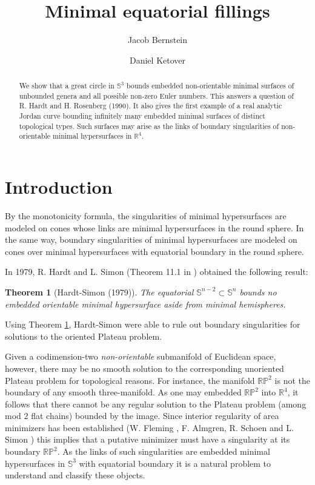 \documentclass[11pt, reqno]{amsart}
\newtheorem{thm}{Theorem}[section]
\numberwithin{equation}{section}
\begin{document}
\title{Minimal equatorial fillings}
\author{Jacob Bernstein}\address{Johns Hopkins University \\ 3400 N. Charles St, Baltimore MD 21218 USA}
\author{Daniel Ketover}\address{Rutgers University\\  Busch Campus - Hill Center \\ 110 Freylinghausen Road, Piscataway NJ 08854 USA} 


\begin{abstract}
We show that a great circle in $\mathbb{S}^3$ bounds embedded non-orientable minimal surfaces of unbounded genera and all possible non-zero Euler numbers.  This answers a question of R. Hardt and H. Rosenberg (1990). It also gives the first example of a real analytic Jordan curve bounding infinitely many embedded minimal surfaces of distinct topological types.  Such surfaces may arise as the links of boundary singularities of non-orientable minimal hypersurfaces in $\mathbb{R}^4$.  
\end{abstract}
\maketitle
\section{Introduction}

By the monotonicity formula, the singularities of minimal hypersurfaces are modeled on cones whose links are minimal hypersurfaces in the round sphere. In the same way, boundary singularities of minimal hypersurfaces are modeled on cones over minimal hypersurfaces with equatorial boundary in the round sphere.

In 1979, R. Hardt and L. Simon (Theorem 11.1 in \cite{HS}) obtained the following result:
\begin{thm}[Hardt-Simon (1979)]\label{orientable}
The equatorial $\mathbb{S}^{n-2}\subset\mathbb{S}^n$ bounds no embedded orientable minimal hypersurface aside from minimal hemispheres.
\end{thm}

Using Theorem \ref{orientable}, Hardt-Simon were able to rule out boundary singularities for solutions to the oriented Plateau problem.  

Given a codimension-two \emph{non-orientable} submanifold of Euclidean space, however, there may be no smooth solution to the corresponding unoriented Plateau problem for topological reasons. For instance, the manifold $\mathbb{RP}^2$ is not the boundary of any smooth three-manifold. As one may embedded $\mathbb{RP}^2$ into $\mathbb{R}^4$, it follows that there cannot be any regular solution to the Plateau problem (among mod $2$ flat chains) bounded by the image.  Since interior regularity of area minimizers has been established (W. Fleming \cite{Fleming2}, F. Almgren, R. Schoen and L. Simon \cite{ASS}) this implies that a putative minimizer must have a singularity at its boundary $\mathbb{RP}^2$.  As the links of such singularities are embedded minimal hypersurfaces in $\mathbb{S}^3$ with equatorial boundary it is a natural problem to understand and classify these objects.   
\end{document}
